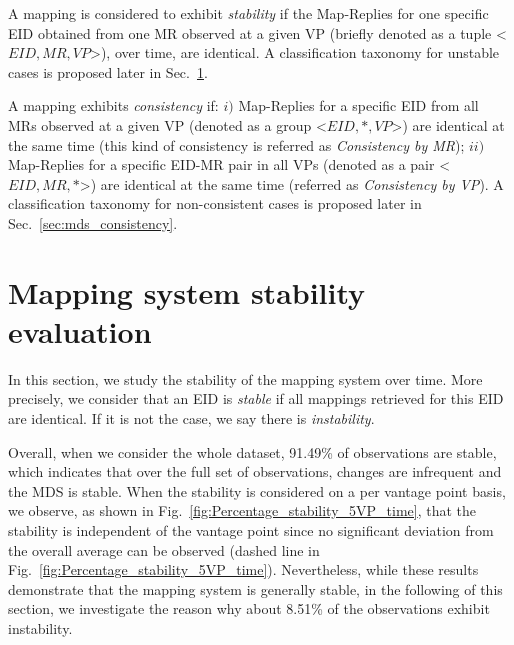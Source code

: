 A mapping is considered to exhibit \textit{stability} if the Map-Replies for one specific EID obtained from one MR observed at a given VP (briefly denoted as a tuple {<$EID, MR, VP$>}), over time, are identical. A classification taxonomy for unstable cases is proposed later in Sec.~\ref{sec:mds_stability}. 

A mapping exhibits \textit{consistency} if: $i)$ Map-Replies for a specific EID from all MRs observed at a given VP (denoted as a group {<$ EID, *, VP $>}) are identical at the same time (this kind of consistency is referred as \emph{Consistency by MR}); $ii)$ Map-Replies for a specific EID-MR pair in all VPs (denoted as a pair {<$ EID, MR, * $>}) are identical at the same time (referred as \emph{Consistency by VP}). A classification taxonomy for non-consistent cases is proposed later in Sec.~\ref{sec:mds_consistency}. 


\section{Mapping system stability evaluation}
\label{sec:mds_stability}

In this section, we study the stability of the mapping system over time. More precisely, we consider that an EID is \emph{stable} if all mappings retrieved for this EID are identical. If it is not the case, we say there is \emph{instability}.

Overall, when we consider the whole dataset, 91.49\% of observations are stable, which indicates that over the full set of observations, changes are infrequent and the MDS is stable. When the stability is considered on a per vantage point basis, we observe, as shown in Fig.~\ref{fig:Percentage_stability_5VP_time}, that the stability is independent of the vantage point since no significant deviation from the overall average can be observed (dashed line in Fig.~\ref{fig:Percentage_stability_5VP_time}). Nevertheless, while these results demonstrate that the mapping system is generally stable, in the following of this section, we investigate the reason why about 8.51\% of the observations exhibit instability.

